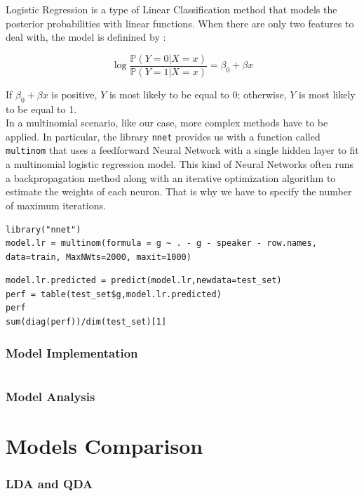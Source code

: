 \documentclass[]{report}
\begin{document}
Logistic Regression is a type of Linear Classification method that models the posterior probabilities with linear functions. When there are only two features to deal with, the model is definined by : 

$$
\log \frac{\mathbb{P}(Y = 0 | X = x)}{\mathbb{P}(Y = 1 | X = x)} = \beta_0 + \beta x
$$

If $\beta_0 + \beta x$ is positive, $Y$ is most likely to be equal to 0; otherwise, $Y$ is most likely to be equal to 1.  \\

In a multinomial scenario, like our case, more complex methods have to be applied. In particular, the library \texttt{nnet} provides us with a function called \texttt{multinom} that uses a feedforward Neural Network with a single hidden layer to fit a multinomial logistic regression model. This kind of Neural Networks often runs a backpropagation method along with an iterative optimization algorithm to estimate the weights of each neuron. That is why we have to specify the number of maximum iterations.

\begin{lstlisting}
library("nnet")
model.lr = multinom(formula = g ~ . - g - speaker - row.names, data=train, MaxNWts=2000, maxit=1000)
\end{lstlisting}

\begin{lstlisting}
model.lr.predicted = predict(model.lr,newdata=test_set)
perf = table(test_set$g,model.lr.predicted)
perf
sum(diag(perf))/dim(test_set)[1]
\end{lstlisting}
\subsubsection{Model Implementation}
\begin{lstlisting}
\end{lstlisting}
\subsubsection{Model Analysis}


\section{Models Comparison}

\subsubsection{LDA and QDA}
\end{document}
